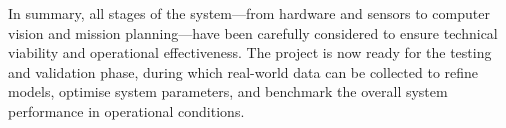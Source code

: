 In summary, all stages of the system—from hardware and sensors to computer vision and mission planning—have been carefully considered to ensure technical viability and operational effectiveness. The project is now ready for the testing and validation phase, during which real-world data can be collected to refine models, optimise system parameters, and benchmark the overall system performance in operational conditions.